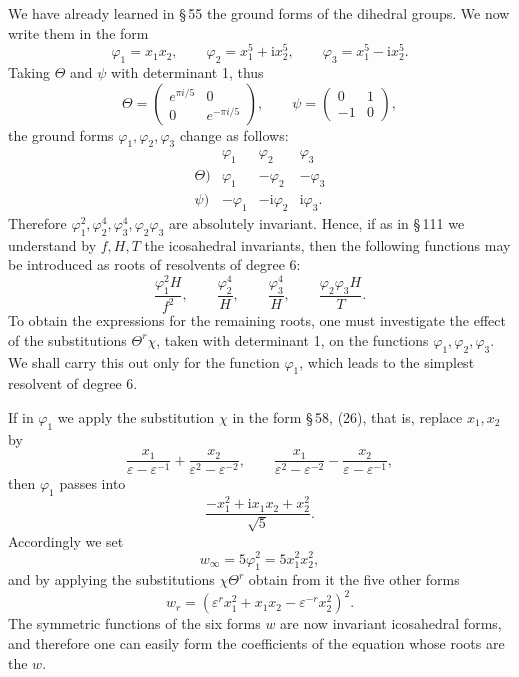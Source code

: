 \documentclass[11pt]{article}
\providecommand{\eps}{\varepsilon}
\providecommand{\ii}{\mathrm{i}}
\providecommand{\eps}{\varepsilon}
\begin{document}
We have already learned in \S\,55 the ground forms of the dihedral groups. We now write them in the form
\[
\varphi_1=x_1x_2,
\qquad
\varphi_2=x_1^5+\ii x_2^5,
\qquad
\varphi_3=x_1^5-\ii x_2^5.
\]
Taking \(\Theta\) and \(\psi\) with determinant 1, thus
\[
\Theta=\begin{pmatrix}e^{\pi i/5}&0\\0&e^{-\pi i/5}\end{pmatrix},
\qquad
\psi=\begin{pmatrix}0&1\\-1&0\end{pmatrix},
\]
the ground forms \(\varphi_1,\varphi_2,\varphi_3\) change as follows:
\[
\begin{array}{c|ccc}
&\varphi_1&\varphi_2&\varphi_3\\\hline
\Theta)&\varphi_1&-\varphi_2&-\varphi_3\\
\psi)&-\varphi_1&-\ii\varphi_2&\ii\varphi_3.
\end{array}
\]
Therefore \(\varphi_1^2,\varphi_2^4,\varphi_3^4,\varphi_2\varphi_3\) are absolutely invariant. Hence, if as in \S\,111 we understand by \(f,H,T\) the icosahedral invariants, then the following functions may be introduced as roots of resolvents of degree 6:
\[
\frac{\varphi_1^2H}{f^2},
\qquad
\frac{\varphi_2^4}{H},
\qquad
\frac{\varphi_3^4}{H},
\qquad
\frac{\varphi_2\varphi_3H}{T}.
\]
To obtain the expressions for the remaining roots, one must investigate the effect of the substitutions \(\Theta^r\chi\), taken with determinant 1, on the functions \(\varphi_1,\varphi_2,\varphi_3\). We shall carry this out only for the function \(\varphi_1\), which leads to the simplest resolvent of degree 6.

If in \(\varphi_1\) we apply the substitution \(\chi\) in the form \S\,58, (26), that is, replace \(x_1,x_2\) by
\[
\frac{x_1}{\eps-\eps^{-1}}+\frac{x_2}{\eps^2-\eps^{-2}},
\qquad
\frac{x_1}{\eps^2-\eps^{-2}}-\frac{x_2}{\eps-\eps^{-1}},
\]
then \(\varphi_1\) passes into
\[
\frac{-x_1^2+\ii x_1x_2+x_2^2}{\sqrt5}.
\]
Accordingly we set
\begin{equation}
w_\infty=5\varphi_1^2=5x_1^2x_2^2,
\tag{3}
\end{equation}
and by applying the substitutions \(\chi\Theta^r\) obtain from it the five other forms
\begin{equation}
w_r=(\eps^r x_1^2+x_1x_2-\eps^{-r}x_2^2)^2.
\tag{4}
\end{equation}
The symmetric functions of the six forms \(w\) are now invariant icosahedral forms, and therefore one can easily form the coefficients of the equation whose roots are the \(w\).
\end{document}

